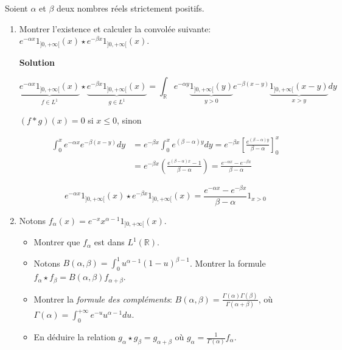 \documentclass[10pt,a4paper,oneside]{article}
\newenvironment{exercice}[1][Exercice]{\begin{trivlist}
\item[\hskip \labelsep {\bfseries #1}]}{\end{trivlist}}
\begin{document}
\begin{exercice}{1}
Soient $\alpha$ et $\beta$ deux nombres réels strictement positifs.

\begin{enumerate}
\item
Montrer l'existence et calculer la convolée suivante: $e^{-\alpha x} 1_{]0,+\infty[}(x) \star e^{-\beta x} 1_{]0,+\infty[}(x)$.

\textbf{Solution}

\[ \underbrace{e^{-\alpha x} 1_{]0,+\infty[}(x)}_{f \in L^1} \star \underbrace{e^{-\beta x} 1_{]0,+\infty[}(x)}_{g \in L^1} = \int_{\mathbb{R}} e^{-\alpha y} \underbrace{1_{]0,+\infty[}(y)}_{y > 0} e^{-\beta(x - y)} \underbrace{1_{]0,+\infty[}(x - y)}_{x > y} dy \]

$(f * g)(x) = 0$ si $x \leq 0$, sinon

\begin{align*}
\int_0^x e^{-\alpha x} e^{-\beta(x - y)} dy &= e^{-\beta x} \int_0^x e^{(\beta - \alpha)y} dy  = e^{-\beta x} \left[ \frac{e^{(\beta - \alpha)y}}{\beta - \alpha} \right]^x_0 \\
&= e^{-\beta x}(\frac{e^{(\beta - \alpha)x} - 1}{\beta - \alpha}) = \frac{e^{-\alpha x} - e^{-\beta x}}{\beta - \alpha}
\end{align*}

\[ \boxed{e^{-\alpha x} 1_{]0,+\infty[}(x) \star e^{-\beta x} 1_{]0,+\infty[}(x) = \frac{e^{-\alpha x} - e^{-\beta x}}{\beta - \alpha} 1_{x > 0}} \]

\item
Notons $f_\alpha(x) = e^{-x} x^{\alpha - 1} 1_{]0,+\infty[}(x)$.

\begin{itemize}
\item
Montrer que $f_\alpha$ est dans $L^1(\mathbb{R})$.

\item
Notons $B(\alpha,\beta) = \int_0^1 u^{\alpha - 1}(1-u)^{\beta - 1}$. Montrer la formule $f_\alpha \star f_\beta = B(\alpha,\beta) f_{\alpha + \beta}$.

\item
Montrer la \textit{formule des compléments}: $B(\alpha,\beta) = \frac{\Gamma(\alpha)\Gamma(\beta)}{\Gamma(\alpha + \beta)}$, où $\Gamma(\alpha) = \int_0^{+\infty} e^{-u} u^{\alpha - 1} du$.

\item
En déduire la relation $g_\alpha \star g_\beta = g_{\alpha + \beta}$ où $g_\alpha = \frac{1}{\Gamma(\alpha)}f_\alpha$.
\end{itemize}
\end{enumerate}
\end{exercice}
\end{document}
